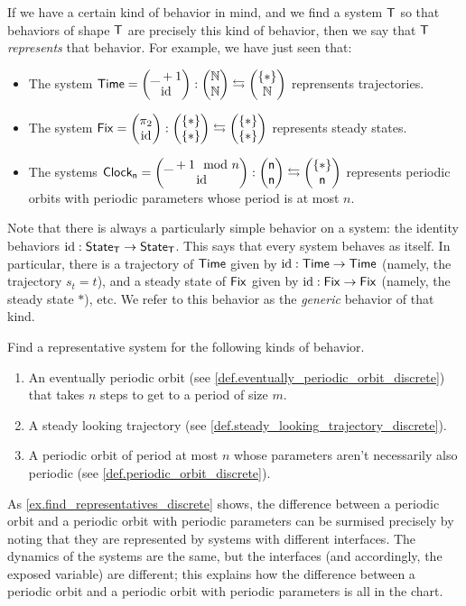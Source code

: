 \documentclass[DynamicalBook]{subfiles}
\begin{document}
{If we have a certain kind of behavior in mind, and we find a system $\mathsf{T}$ so
that behaviors of shape $\mathsf{T}$ are precisely this kind of behavior, then we
say that $\mathsf{T}$ \emph{represents} that behavior. For example, we have just
seen that:
\begin{itemize}
  \item The system $\mathsf{Time} = \begin{pmatrix}{\_ + 1} \\ {\mathrm{id}} \end{pmatrix} : \begin{pmatrix}{\mathbb{N}} \\ {\mathbb{N}} \end{pmatrix} \leftrightarrows
    \begin{pmatrix}{\{\ast\}} \\ {\mathbb{N}} \end{pmatrix}$ reprensents trajectories.
  \item The system $\mathsf{Fix} = \begin{pmatrix}{\pi_2} \\ {\mathrm{id}} \end{pmatrix} : \begin{pmatrix}{\{\ast\}} \\ {\{\ast\}} \end{pmatrix}
    \leftrightarrows \begin{pmatrix}{\{\ast\}} \\ {\{\ast\}} \end{pmatrix}$ represents steady states.
  \item The systems $\mathsf{Clock_n} = \begin{pmatrix}{\_ + 1 \mod n} \\ {\mathrm{id}} \end{pmatrix} :
    \begin{pmatrix}{\mathsf{n}} \\ {\mathsf{n}} \end{pmatrix} \leftrightarrows \begin{pmatrix}{\{\ast\}} \\ {\mathsf{n}} \end{pmatrix}$
    represents periodic orbits with periodic parameters whose period is at most $n$.
\end{itemize}

Note that there is always a particularly simple behavior on a system: the
identity behaviors $\mathrm{id} : \mathsf{State}_{\mathsf{T}} \to \mathsf{State}_{\mathsf{T}}$. This says that every system
behaves as itself. In particular, there is a trajectory of $\mathsf{Time}$ given by
$\mathrm{id} : \mathsf{Time} \to \mathsf{Time}$ (namely, the trajectory $s_t = t$), and a
steady state of $\mathsf{Fix}$ given by $\mathrm{id} : \mathsf{Fix} \to \mathsf{Fix}$ (namely,
the steady state $\ast$), etc. We refer to this behavior as the \emph{generic}
behavior of that kind.

\begin{exercise}\label{ex.find_representatives_discrete}
  Find a representative system for the following kinds of behavior.
  \begin{enumerate}
    \item An eventually periodic orbit (see \cref{def.eventually_periodic_orbit_discrete}) that takes $n$ steps to get to a period
      of size $m$.
    \item A steady looking trajectory (see \cref{def.steady_looking_trajectory_discrete}).
    \item A periodic orbit of period at most $n$ whose parameters aren't
      necessarily also periodic (see \cref{def.periodic_orbit_discrete}).
  \end{enumerate}
\end{exercise}

\begin{remark}\label{rmk.periodic_parameters_versus_not}
As \cref{ex.find_representatives_discrete} shows, the difference between a
periodic orbit and a periodic orbit with periodic parameters can be surmised
precisely by noting that they are represented by systems with different
interfaces. The dynamics of the systems are the same, but the interfaces (and
accordingly, the exposed variable) are different; this explains how the
difference between a periodic orbit and a periodic orbit with periodic
parameters is all in the chart.
\end{remark}

}
\end{document}

